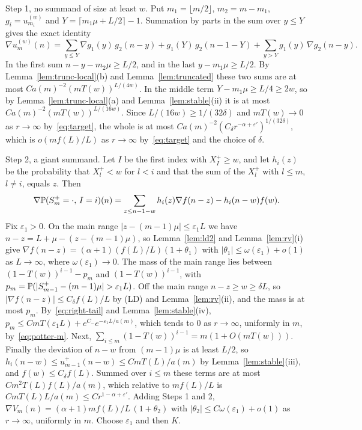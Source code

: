 Step 1, no summand of size at least $w$. Put $m_1=\lfloor m/2\rfloor$, $m_2=m-m_1$,
$g_i=u^{(w)}_{m_i}$ and $Y=\lceil m_1\mu+L/2\rceil-1$. Summation by parts in the sum over $y\le Y$
gives the exact identity
\[
 \nabla u^{(w)}_m(n)=\sum_{y\le Y}\nabla g_1(y)\,g_2(n-y)+g_1(Y)\,g_2(n-1-Y)+\sum_{y>Y}g_1(y)\,\nabla g_2(n-y).
\]
In the first sum $n-y-m_2\mu\ge L/2$, and in the last $y-m_1\mu\ge L/2$. By
Lemma~\ref{lem:trunc-local}(b) and Lemma~\ref{lem:truncated} these two sums are at most
$Ca(m)^{-2}(mT(w))^{L/(4w)}$. In the middle term $Y-m_1\mu\ge L/4\ge2w$, so by
Lemma~\ref{lem:trunc-local}(a) and Lemma~\ref{lem:stable}(ii) it is at most
$Ca(m)^{-2}(mT(w))^{L/(16w)}$. Since $L/(16w)\ge1/(32\delta)$ and $mT(w)\to0$ as $r\to\infty$
by~\eqref{eq:target}, the whole is at most $Ca(m)^{-2}(C_\delta r^{-\alpha+\varepsilon'})^{1/(32\delta)}$,
which is $o(mf(L)/L)$ as $r\to\infty$ by~\eqref{eq:target} and the choice of $\delta$.

Step 2, a giant summand. Let $I$ be the first index with $X^\plus_I\ge w$, and let $h_i(z)$ be
the probability that $X^\plus_l<w$ for $l<i$ and that the sum of the $X^\plus_l$ with $l\le m$,
$l\ne i$, equals $z$. Then
\[
 \nabla\mathbb{P}(S^{+}_m=\cdot,\,I=i)(n)=\sum_{z\le n-1-w}h_i(z)\nabla f(n-z)-h_i(n-w)f(w).
\]
Fix $\varepsilon_1>0$. On the main range $|z-(m-1)\mu|\le\varepsilon_1L$ we have
$n-z=L+\mu-(z-(m-1)\mu)$, so Lemma~\ref{lem:ld2} and Lemma~\ref{lem:rv}(i) give
$\nabla f(n-z)=(\alpha+1)(f(L)/L)(1+\theta_1)$ with $|\theta_1|\le\omega(\varepsilon_1)+o(1)$ as
$L\to\infty$, where $\omega(\varepsilon_1)\to0$. The mass of the main range lies between
$(1-T(w))^{i-1}-p_m$ and $(1-T(w))^{i-1}$, with $p_m=\Prob(|S^\plus_{m-1}-(m-1)\mu|>\varepsilon_1L)$.
Off the main range $n-z\ge w\ge\delta L$, so $|\nabla f(n-z)|\le C_\delta f(L)/L$ by (LD) and
Lemma~\ref{lem:rv}(ii), and the mass is at most $p_m$. By~\eqref{eq:right-tail}
and Lemma~\ref{lem:stable}(iv),
$p_m\le CmT(\varepsilon_1L)+e^{C_-}e^{-\varepsilon_1L/a(m)}$, which tends to $0$ as $r\to\infty$,
uniformly in $m$, by~\eqref{eq:potter-m}. Next,
$\sum_{i\le m}(1-T(w))^{i-1}=m(1+O(mT(w)))$. Finally the deviation of $n-w$ from $(m-1)\mu$ is at
least $L/2$, so $h_i(n-w)\le u^\plus_{m-1}(n-w)\le CmT(L)/a(m)$ by Lemma~\ref{lem:stable}(iii),
and $f(w)\le C_\delta f(L)$. Summed over $i\le m$ these terms are at most $Cm^2T(L)f(L)/a(m)$,
which relative to $mf(L)/L$ is $CmT(L)L/a(m)\le Cr^{1-\alpha+\varepsilon'}$. Adding Steps 1 and 2,
$\nabla V_m(n)=(\alpha+1)mf(L)/L\,(1+\theta_2)$ with $|\theta_2|\le C\omega(\varepsilon_1)+o(1)$ as
$r\to\infty$, uniformly in $m$. Choose $\varepsilon_1$ and then $K$.

